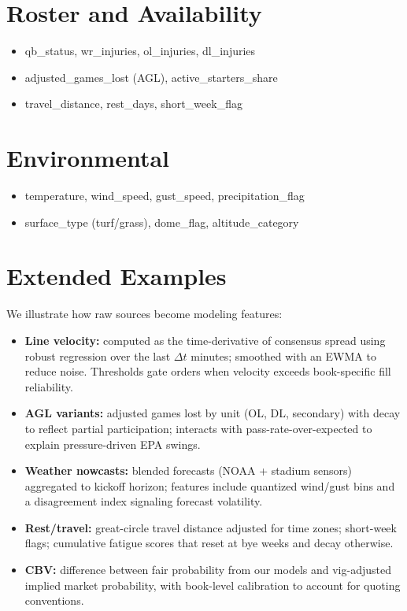 \documentclass[12pt]{report}  %
\numberwithin{equation}{section}
\theoremstyle{plain}
\theoremstyle{definition}
\theoremstyle{remark}
\begin{document}
\section{Roster and Availability}
\begin{itemize}
  \item qb\_status, wr\_injuries, ol\_injuries, dl\_injuries
  \item adjusted\_games\_lost (AGL), active\_starters\_share
  \item travel\_distance, rest\_days, short\_week\_flag
\end{itemize}

\section{Environmental}
\begin{itemize}
  \item temperature, wind\_speed, gust\_speed, precipitation\_flag
  \item surface\_type (turf/grass), dome\_flag, altitude\_category
\end{itemize}

\section{Extended Examples}
We illustrate how raw sources become modeling features:
\begin{itemize}
  \item \textbf{Line velocity:} computed as the time-derivative of consensus spread using robust regression over the last \(\Delta t\) minutes; smoothed with an EWMA to reduce noise. Thresholds gate orders when velocity exceeds book-specific fill reliability.
  \item \textbf{AGL variants:} adjusted games lost by unit (OL, DL, secondary) with decay to reflect partial participation; interacts with pass-rate-over-expected to explain pressure-driven EPA swings.
  \item \textbf{Weather nowcasts:} blended forecasts (NOAA + stadium sensors) aggregated to kickoff horizon; features include quantized wind/gust bins and a disagreement index signaling forecast volatility.
  \item \textbf{Rest/travel:} great-circle travel distance adjusted for time zones; short-week flags; cumulative fatigue scores that reset at bye weeks and decay otherwise.
  \item \textbf{CBV:} difference between fair probability from our models and vig-adjusted implied market probability, with book-level calibration to account for quoting conventions.
\end{itemize}
\end{document}
